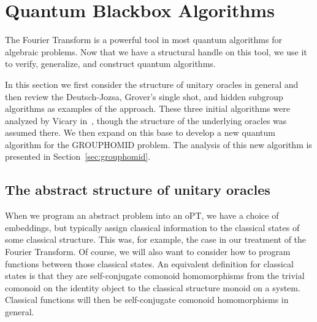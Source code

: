 \section{Quantum Blackbox Algorithms}
\label{sec:blackbox}
The Fourier Transform is a powerful tool in most quantum algorithms for algebraic problems. Now that we have a structural handle on this tool, we use it to verify, generalize, and construct quantum algorithms.

In this section we first consider the structure of unitary oracles in general and then review the Deutsch-Jozsa, Grover's single shot, and hidden subgroup algorithms as examples of the approach.  These three initial algorithms were analyzed by Vicary in~\cite{vicary-tqa}, though the structure of the underlying oracles was assumed there.  We then expand on this base to develop a new quantum algorithm for the GROUPHOMID problem. The analysis of this new algorithm is presented in Section~\ref{sec:grouphomid}.

\subsection{The abstract structure of unitary oracles}
\label{sec:unitaryoracles}

When we program an abstract problem into an oPT, we have a choice of embeddings, but typically assign classical information to the classical states of some classical structure. This was, for example, the case in our treatment of the Fourier Transform. Of course, we will also want to consider how to program functions between those classical states. An equivalent definition for classical states is that they are self-conjugate comonoid homomorphisms from the trivial comonoid on the identity object to the classical structure monoid on a system. Classical functions will then be self-conjugate comonoid homomorphisms in general.


